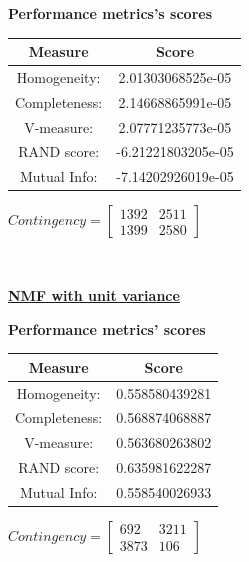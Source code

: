 \documentclass{report}
\begin{document}
\begin{center}
	\textbf{Performance metrics's scores} \\ \vspace{10pt}	
	\begin{tabular}{*{2}{c}}
		\toprule
		\textbf{Measure} & \textbf{Score} \\		
		\midrule
		Homogeneity: 		& 2.01303068525e-05 \\
		\midrule
		Completeness: 		& 2.14668865991e-05 \\
		\midrule
		V-measure: 			& 2.07771235773e-05 \\
		\midrule
		RAND score: 		& -6.21221803205e-05 \\
		\midrule
		Mutual Info: 		& -7.14202926019e-05 \\
		\bottomrule
	\end{tabular}
	\qquad
	$Contingency = \left[\begin{array}{*{2}{c}}
		1392 		& 2511 \\
		1399 		& 2580 
			\end{array}\right]
		$
\end{center}

\\ \vspace{20pt}

\underline{\textbf{NMF with unit variance}} 

\begin{center}
	\textbf{Performance metrics' scores} \\ \vspace{10pt}		
	\begin{tabular}{*{2}{c}}	
		\toprule
		\textbf{Measure} & \textbf{Score} \\		
		\midrule
		Homogeneity: 		& 0.558580439281 \\
		\midrule
		Completeness: 		& 0.568874068887 \\
		\midrule
		V-measure: 			& 0.563680263802 \\
		\midrule
		RAND score: 		& 0.635981622287 \\
		\midrule
		Mutual Info: 		& 0.558540026933 \\
		\bottomrule
	\end{tabular}
	\qquad	
	$Contingency = \left[ \begin{array}{*{2}{c}}
		692 		& 3211 \\
		3873  		& 106 
			\end{array}\right]
		$
\end{center}
\newpage
\end{document}
